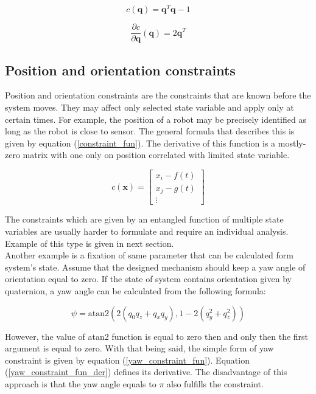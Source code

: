 \begin{equation}
	c \left( \bm{q} \right) = \bm{q}^T \bm{q} - 1
\label{quat_constraint_fun}
\end{equation}

\begin{equation}
	\frac{\partial c}{\partial \bm{q}}  \left( \bm{q} \right) = 2\bm{q}^T
	\label{quat_constraint_fun_der}
\end{equation}

\subsection{Position and orientation constraints}

Position and orientation constraints are the constraints that are known before the system moves. They may affect only selected state variable and apply only at certain times. For example, the position of a robot may be precisely identified as long as the robot is close to sensor. The general formula that describes this is given by equation (\ref{constraint_fun}). The derivative of this function is a mostly-zero matrix with one only on position correlated with limited state variable.

\begin{equation}
	c \left( \bm{x} \right) = \begin{bmatrix}
		x_i - f\left(t\right) \\
		x_j - g\left(t\right)\\
		\vdots
		\end{bmatrix}
	\label{constraint_fun}
\end{equation} 

The constraints which are given by an entangled function of multiple state variables are usually harder to formulate and require an individual analysis. Example of this type is given in next section.\\

Another example is a fixation of same parameter that can be calculated form system's state. Assume that the designed mechanism should keep a yaw angle of orientation equal to zero. If the state of system contains orientation given by quaternion, a yaw angle can be calculated from the following formula:

\begin{equation}
	\psi = {\mbox{atan2}}\left(2(q_{0}q_{z}+q_{x}q_{y}),1-2(q_{y}^{2}+q_{z}^{2})\right)
\end{equation}

However, the value of atan2 function is equal to zero then and only then the first argument is equal to zero. With that being said, the simple form of yaw constraint is given by equation (\ref{yaw_constraint_fun}). Equation (\ref{yaw_constraint_fun_der}) defines its derivative. The disadvantage of this approach is that the yaw angle equals to $\pi$ also fulfills the constraint.

